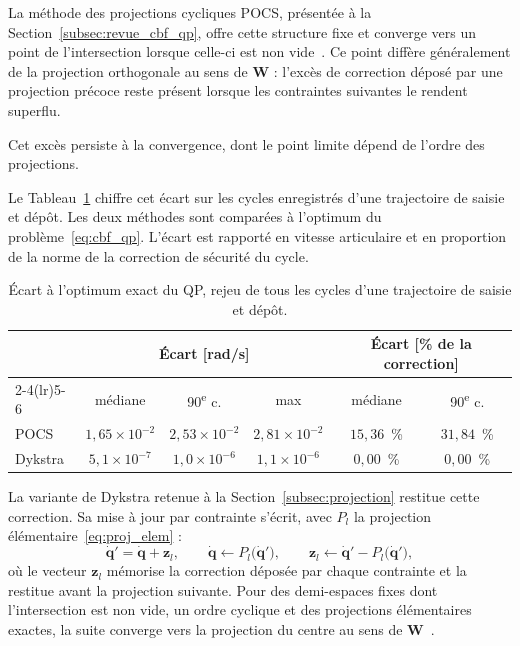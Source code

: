 La méthode des projections cycliques \ac{POCS}, présentée à la Section~\ref{subsec:revue_cbf_qp}, offre cette structure fixe et converge vers un point de l'intersection lorsque celle-ci est non vide~\cite{Bauschke1996Projection}. Ce point diffère généralement de la projection orthogonale au sens de $\mathbf{W}$ : l'excès de correction déposé par une projection précoce reste présent lorsque les contraintes suivantes le rendent superflu.

Cet excès persiste à la convergence, dont le point limite dépend de l'ordre des projections.

Le Tableau~\ref{tab:solveur_rejeu} chiffre cet écart sur les cycles enregistrés d'une trajectoire de saisie et dépôt. Les deux méthodes sont comparées à l'optimum du problème~\eqref{eq:cbf_qp}. L'écart est rapporté en vitesse articulaire et en proportion de la norme de la correction de sécurité du cycle.

\begin{table}[htbp]
\centering
\caption[Écart à l'optimum exact du QP sur une trajectoire]{Écart à l'optimum exact du \ac{QP}, rejeu de tous les cycles d'une trajectoire de saisie et dépôt.}
\label{tab:solveur_rejeu}
\small
\begin{tabular}{lccccc}
\toprule
& \multicolumn{3}{c}{Écart [rad/s]} & \multicolumn{2}{c}{Écart [\% de la correction]} \\
\cmidrule(lr){2-4}\cmidrule(lr){5-6}
& médiane & 90\textsuperscript{e} c. & max & médiane & 90\textsuperscript{e} c. \\
\midrule
\ac{POCS} & $1{,}65\times10^{-2}$ & $2{,}53\times10^{-2}$ & $2{,}81\times10^{-2}$ & $15{,}36$~\% & $31{,}84$~\% \\
Dykstra & $5{,}1\times10^{-7}$ & $1{,}0\times10^{-6}$ & $1{,}1\times10^{-6}$ & $0{,}00$~\% & $0{,}00$~\% \\
\bottomrule
\end{tabular}
\end{table}

La variante de Dykstra retenue à la Section~\ref{subsec:projection} restitue cette correction. Sa mise à jour par contrainte s'écrit, avec $P_l$ la projection élémentaire~\eqref{eq:proj_elem} :
\begin{equation}\label{eq:dykstra_update}
\dot{\mathbf{q}}' = \dot{\mathbf{q}} + \mathbf{z}_l,
\qquad
\dot{\mathbf{q}} \leftarrow P_l\big(\dot{\mathbf{q}}'\big),
\qquad
\mathbf{z}_l \leftarrow \dot{\mathbf{q}}' - P_l\big(\dot{\mathbf{q}}'\big),
\end{equation}
où le vecteur $\mathbf{z}_l$ mémorise la correction déposée par chaque contrainte et la restitue avant la projection suivante. Pour des demi-espaces fixes dont l'intersection est non vide, un ordre cyclique et des projections élémentaires exactes, la suite converge vers la projection du centre au sens de $\mathbf{W}$~\cite{Dykstra1983Restricted,Boyle1986Method}.

